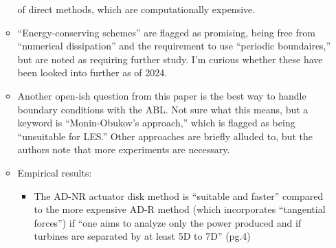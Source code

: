 \documentclass[12pt]{article}
\begin{document}
\begin{itemize}
\begin{itemize}
            of direct methods, which are computationally expensive.
        \item ``Energy-conserving schemes'' are flagged as promising, being free from ``numerical dissipation''
            and the requirement to use ``periodic boundaires,'' but are noted as requiring further study.
            I'm curious whether these have been looked into further as of 2024.
        \item Another open-ish question from this paper is the best way to handle boundary conditions
            with the ABL. Not sure what this means, but a keyword is ``Monin-Obukov's approach,''
            which is flagged as being ``unsuitable for LES.'' Other approaches are briefly
            alluded to, but the authors note that more experiments are necessary.
        \item Empirical results:
            \begin{itemize}
                \item The AD-NR actuator disk method is ``suitable and faster'' compared
                    to the more expensive AD-R method (which incorporates ``tangential forces'')
                    if ``one aims to analyze only the power produced and if turbines are separated
                    by at least 5D to 7D'' (pg.4)
            \end{itemize}
    \end{itemize}
\end{itemize}
\end{document}
